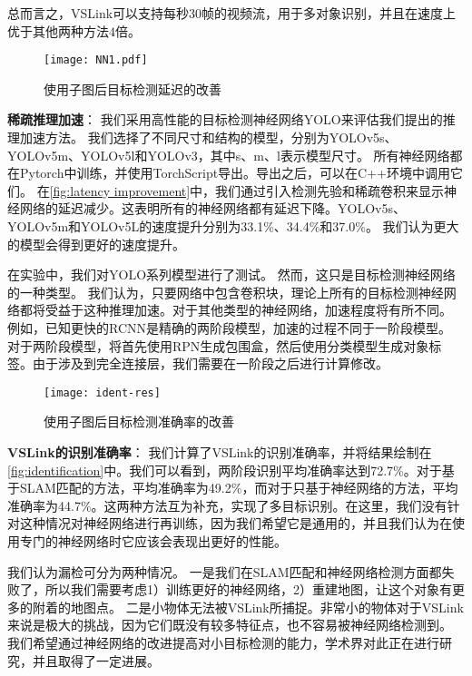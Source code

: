 总而言之，VSLink可以支持每秒30帧的视频流，用于多对象识别，并且在速度上优于其他两种方法$4$倍。

\begin{figure}[htb]
	\centering
	\texttt{[image: NN1.pdf]}
	\caption{使用子图后目标检测延迟的改善}
	\label{fig:latency improvement}
\end{figure}

\textbf{稀疏推理加速}：
我们采用高性能的目标检测神经网络YOLO\cite{redmon2016you}来评估我们提出的推理加速方法。
我们选择了不同尺寸和结构的模型，分别为YOLOv5s、YOLOv5m、YOLOv5l和YOLOv3，其中s、m、l表示模型尺寸。
所有神经网络都在Pytorch中训练，并使用TorchScript导出。导出之后，可以在C++环境中调用它们。
在\autoref{fig:latency improvement}中，我们通过引入检测先验和稀疏卷积来显示神经网络的延迟减少。这表明所有的神经网络都有延迟下降。YOLOv5s、YOLOv5m和YOLOv5L的速度提升分别为33.1\%、34.4\%和37.0\%。
我们认为更大的模型会得到更好的速度提升。

在实验中，我们对YOLO系列模型进行了测试。
然而，这只是目标检测神经网络的一种类型。
我们认为，只要网络中包含卷积块，理论上所有的目标检测神经网络都将受益于这种推理加速。对于其他类型的神经网络，加速程度将有所不同。
例如，已知更快的RCNN是精确的两阶段模型，加速的过程不同于一阶段模型。
对于两阶段模型，将首先使用RPN生成包围盒，然后使用分类模型生成对象标签。由于涉及到完全连接层，我们需要在一阶段之后进行计算修改。


\begin{figure*}[htb]
	\centering
	\texttt{[image: ident-res]}
	\caption{使用子图后目标检测准确率的改善}
	\label{fig:identification}
\end{figure*}

\textbf{VSLink的识别准确率}：
我们计算了VSLink的识别准确率，并将结果绘制在\autoref{fig:identification}中。我们可以看到，两阶段识别平均准确率达到72.7\%。对于基于SLAM匹配的方法，平均准确率为49.2\%，而对于只基于神经网络的方法，平均准确率为44.7\%。这两种方法互为补充，实现了多目标识别。在这里，我们没有针对这种情况对神经网络进行再训练，因为我们希望它是通用的，并且我们认为在使用专门的神经网络时它应该会表现出更好的性能。

我们认为漏检可分为两种情况。
一是我们在SLAM匹配和神经网络检测方面都失败了，所以我们需要考虑1）训练更好的神经网络，2）重建地图，让这个对象有更多的附着的地图点。
二是小物体无法被VSLink所捕捉。非常小的物体对于VSLink来说是极大的挑战，因为它们既没有较多特征点，也不容易被神经网络检测到。
我们希望通过神经网络的改进提高对小目标检测的能力，学术界对此正在进行研究，并且取得了一定进展。

